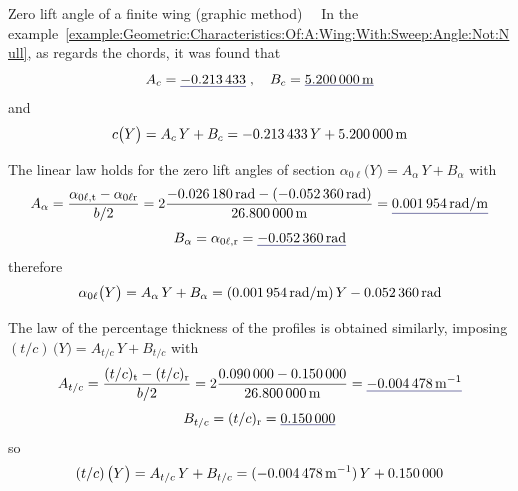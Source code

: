 \documentclass[[12pt,twoside]{book}
\begin{document}
\begin{myExampleX}{Zero lift angle of a finite wing (graphic method)}{\ \myIconGraph\ }
In the example~\ref{example:Geometric:Characteristics:Of:A:Wing:With:Sweep:Angle:Not:Null}, as regards the chords, it was found that
\[
A_c
  = \mathunderline{mydarkblue}{ \SI[round-precision=3]{\myCoeffAChordWing}{} }
\;,\quad
B_c
  = \mathunderline{mydarkblue}{ \SI[round-precision=2]{\myCoeffBChordWingMT}{\metre} }
\]
and
\[
c \big( Y \big) = A_c \, Y + B_c
  = \SI[round-precision=3]{\myCoeffAChordWing}{} \, Y
    + \SI[round-precision=2]{\myCoeffBChordWingMT}{\metre}
\]

The linear law holds for the  zero lift angles of section $\alpha_{0\ell} \big( Y \big) = A_{\alpha} \, Y + B_{\alpha}$ 
with
\[
A_{\alpha}
  = \frac{\alpha_{0\ell,\mathrm{t}} - \alpha_{0\ell\mathrm{r}}}{b/2}
  = 
    2 \frac{
      \SI[round-precision=4]{\myAlphaZeroLiftTipWingRAD}{\radian} 
        - ( \SI[round-precision=4]{\myAlphaZeroLiftRootWingRAD}{\radian} )
    }{
      \SI[round-precision=2]{\mySpanWingMT}{\metre}
    }
  = \mathunderline{mydarkblue}{ \SI[round-precision=5]{\myCoeffAAeroTwistWingRADMT}{\radian/\metre} }
\]
\[
B_{\alpha}
  = \alpha_{0\ell,\mathrm{r}}
  = \mathunderline{mydarkblue}{ \SI[round-precision=4]{\myAlphaZeroLiftRootWingRAD}{\radian} }
\]
therefore
\[
\alpha_{0\ell} \big( Y \big) = A_{\alpha} \, Y + B_{\alpha}
  = (\SI[round-precision=5]{\myCoeffAAeroTwistWingRADMT}{\radian/\metre}) \, Y
    \SI[round-precision=4]{\myAlphaZeroLiftRootWingRAD}{\radian}
\]

The law of the percentage thickness of the profiles is obtained similarly,
imposing
$(t/c)\,\big( Y \big) = A_{t/c} \, Y + B_{t/c}$ 
with
\[
A_{t/c}
  = \frac{(t/c)_{\mathrm{t}} - (t/c)_{\mathrm{r}}}{b/2}
  = 
    2 \frac{
      \SI[round-precision=2]{\myThicknessOverChordTipWing}{} 
        - \SI[round-precision=4]{\myThicknessOverChordRootWing}{}
    }{
      \SI[round-precision=2]{\mySpanWingMT}{\metre}
    }
  = \mathunderline{mydarkblue}{ \SI[round-precision=5]{\myCoeffAPercThicknessWingMT}{\metre^{-1}} }
\]
\[
B_{t/c}
  = (t/c)_{\mathrm{r}}
  = \mathunderline{mydarkblue}{ \SI[round-precision=2]{\myCoeffBPercThicknessWing}{} }
\]
so
\[
(t/c)\,\big( Y \big) = A_{t/c} \, Y + B_{t/c}
  = (\SI[round-precision=5]{\myCoeffAPercThicknessWingMT}{\metre^{-1}}) \, Y
    + \SI[round-precision=2]{\myCoeffBPercThicknessWing}{}
\]


\end{myExampleX}
\end{document}
